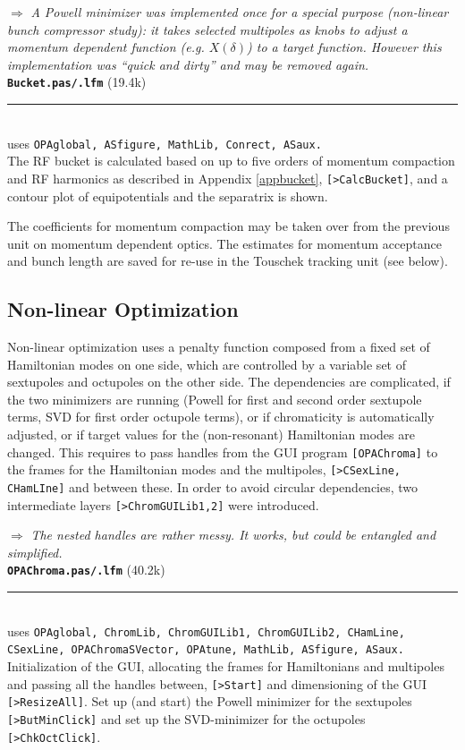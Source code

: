 \documentclass[12pt]{article}
\newcommand\todo[1]{$\Longrightarrow$ {\em #1} }
\newcommand\code[1]{{\tt [#1]}}
\newcommand\opamodule[3]{{\bf \tt #1} #2\\  \rule[3pt]{\textwidth}{0.2pt} \\ {\scriptsize uses \tt  #3}\\[1ex]}
\begin{document}
\todo{A Powell minimizer was implemented once for a special purpose (non-linear bunch compressor study): it takes selected multipoles as knobs to adjust a momentum dependent function (e.g. $X(\delta)$) to a target function. However this implementation was ``quick and dirty'' and may be removed again.}\\


\opamodule{Bucket.pas/.lfm}{(19.4k)}{OPAglobal, ASfigure, MathLib, Conrect, ASaux.}
The RF bucket is calculated based on up to five orders of momentum compaction and RF harmonics as described in Appendix \ref{appbucket}, \code{>CalcBucket}, and a contour plot of equipotentials and the separatrix is shown.

The coefficients for momentum compaction may be taken over from the previous unit on momentum dependent optics. The estimates for momentum acceptance and bunch length are saved for re-use in the Touschek tracking unit (see below).\\

\subsection{Non-linear Optimization}
Non-linear optimization uses a penalty function composed from a fixed set of Hamiltonian modes on one side, which are controlled by a variable set of sextupoles and octupoles on the other side.
The dependencies are complicated, if the two minimizers are running (Powell for first and second order sextupole terms, SVD for first order octupole terms), or if chromaticity is automatically adjusted, or if target values for the (non-resonant) Hamiltonian modes are changed. This requires to pass handles from the GUI program \code{OPAChroma} to the frames for the Hamiltonian modes and the multipoles, \code{>CSexLine, CHamLIne} and between these. In order to avoid circular dependencies, two intermediate layers \code{>ChromGUILib1,2} were introduced.

\todo{The nested handles are rather messy. It works, but could be entangled and simplified.}\\

\opamodule{OPAChroma.pas/.lfm}{(40.2k)}{OPAglobal, ChromLib, ChromGUILib1, ChromGUILib2, CHamLine, CSexLine, OPAChromaSVector, OPAtune, MathLib, ASfigure, ASaux.}
Initialization of the GUI, allocating the frames for Hamiltonians and multipoles and passing all the handles between, \code{>Start} and dimensioning of the GUI \code{>ResizeAll}.
Set up (and start) the Powell minimizer for the sextupoles \code{>ButMinClick} and set up the SVD-minimizer for the octupoles \code{>ChkOctClick}.\\
\end{document}
